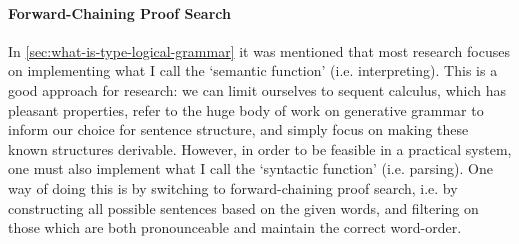 \documentclass[a4paper]{article}
\begin{document}
\paragraph*{Forward-Chaining Proof Search}
In \autoref{sec:what-is-type-logical-grammar} it was mentioned that
most research focuses on implementing what I call the `semantic
function' (i.e. interpreting). This is a good approach for research:
we can limit ourselves to sequent calculus, which has pleasant
properties, refer to the huge body of work on generative grammar to
inform our choice for sentence structure, and simply focus on making
these known structures derivable. However, in order to be feasible in
a practical system, one must also implement what I call the `syntactic
function' (i.e. parsing). One way of doing this is by switching to
forward-chaining proof search, i.e. by constructing all possible
sentences based on the given words, and filtering on those which are
both pronounceable and maintain the correct word-order.



%
%
\end{document}
